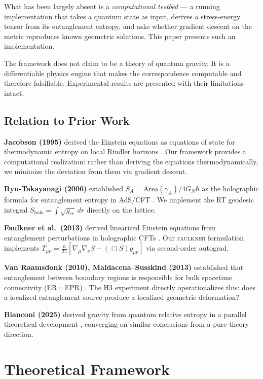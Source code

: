 \documentclass[12pt,a4paper]{article}
\begin{document}
What has been largely absent is a \emph{computational testbed} --- a running
implementation that takes a quantum state as input, derives a stress-energy
tensor from its entanglement entropy, and asks whether gradient descent on the
metric reproduces known geometric solutions.
This paper presents such an implementation.

The framework does not claim to be a theory of quantum gravity. It is a
differentiable physics engine that makes the correspondence computable and
therefore falsifiable. Experimental results are presented with their
limitations intact.

\subsection{Relation to Prior Work}

\textbf{Jacobson (1995)} derived the Einstein equations as equations of state
for thermodynamic entropy on local Rindler horizons \cite{jacobson1995}.
Our framework provides a computational realization: rather than deriving the
equations thermodynamically, we minimize the deviation from them via
gradient descent.

\textbf{Ryu-Takayanagi (2006)} established
$S_A = \mathrm{Area}(\gamma_A)/4G_N\hbar$ as the holographic formula for
entanglement entropy in AdS/CFT \cite{ryu2006}.
We implement the RT geodesic integral
$S_{\mathrm{holo}}=\int\sqrt{g_{rr}}\,dr$ directly on the lattice.

\textbf{Faulkner et al.\ (2013)} derived linearized Einstein equations from
entanglement perturbations in holographic CFTs \cite{faulkner2014}.
Our \textsc{faulkner} formulation implements
$T_{\mu\nu}=\frac{\hbar}{2\pi}[\nabla_\mu\nabla_\nu S - (\Box S)g_{\mu\nu}]$
via second-order autograd.

\textbf{Van Raamsdonk (2010), Maldacena--Susskind (2013)} established that
entanglement between boundary regions is responsible for bulk spacetime
connectivity (ER\,=\,EPR) \cite{vanraamsdonk2010,maldacena2013}.
The H3 experiment directly operationalizes this: does a localized entanglement
source produce a localized geometric deformation?

\textbf{Bianconi (2025)} derived gravity from quantum relative entropy in a
parallel theoretical development \cite{bianconi2025}, converging on similar
conclusions from a pure-theory direction.

\section{Theoretical Framework}
\end{document}
